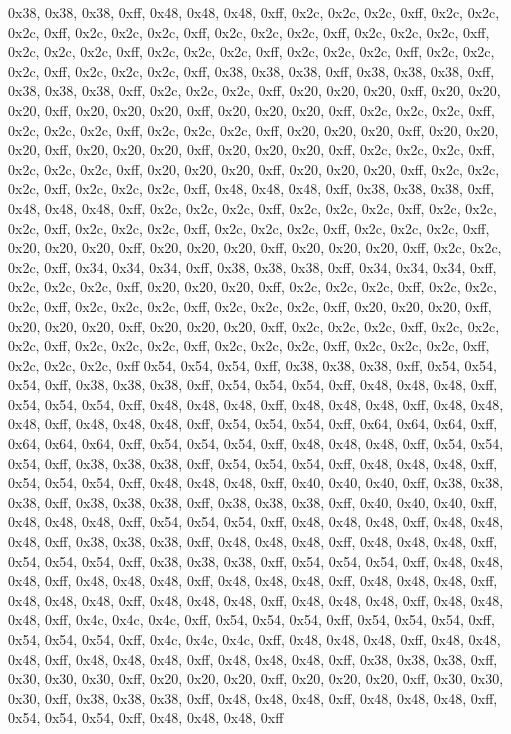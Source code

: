 0x38, 0x38, 0x38, 0xff, 0x48, 0x48, 0x48, 0xff, 0x2c, 0x2c, 0x2c, 0xff, 0x2c, 0x2c, 0x2c, 0xff, 0x2c, 0x2c, 0x2c, 0xff, 0x2c, 0x2c, 0x2c, 0xff, 0x2c, 0x2c, 0x2c, 0xff, 0x2c, 0x2c, 0x2c, 0xff, 0x2c, 0x2c, 0x2c, 0xff, 0x2c, 0x2c, 0x2c, 0xff, 0x2c, 0x2c, 0x2c, 0xff, 0x2c, 0x2c, 0x2c, 0xff, 0x38, 0x38, 0x38, 0xff, 0x38, 0x38, 0x38, 0xff, 0x38, 0x38, 0x38, 0xff, 0x2c, 0x2c, 0x2c, 0xff, 0x20, 0x20, 0x20, 0xff, 0x20, 0x20, 0x20, 0xff, 0x20, 0x20, 0x20, 0xff, 0x20, 0x20, 0x20, 0xff, 0x2c, 0x2c, 0x2c, 0xff, 0x2c, 0x2c, 0x2c, 0xff, 0x2c, 0x2c, 0x2c, 0xff, 0x20, 0x20, 0x20, 0xff, 0x20, 0x20, 0x20, 0xff, 0x20, 0x20, 0x20, 0xff, 0x20, 0x20, 0x20, 0xff, 0x2c, 0x2c, 0x2c, 0xff, 0x2c, 0x2c, 0x2c, 0xff, 0x20, 0x20, 0x20, 0xff, 0x20, 0x20, 0x20, 0xff, 0x2c, 0x2c, 0x2c, 0xff, 0x2c, 0x2c, 0x2c, 0xff, 0x48, 0x48, 0x48, 0xff, 0x38, 0x38, 0x38, 0xff, 0x48, 0x48, 0x48, 0xff, 0x2c, 0x2c, 0x2c, 0xff, 0x2c, 0x2c, 0x2c, 0xff, 0x2c, 0x2c, 0x2c, 0xff, 0x2c, 0x2c, 0x2c, 0xff, 0x2c, 0x2c, 0x2c, 0xff, 0x2c, 0x2c, 0x2c, 0xff, 0x20, 0x20, 0x20, 0xff, 0x20, 0x20, 0x20, 0xff, 0x20, 0x20, 0x20, 0xff, 0x2c, 0x2c, 0x2c, 0xff, 0x34, 0x34, 0x34, 0xff, 0x38, 0x38, 0x38, 0xff, 0x34, 0x34, 0x34, 0xff, 0x2c, 0x2c, 0x2c, 0xff, 0x20, 0x20, 0x20, 0xff, 0x2c, 0x2c, 0x2c, 0xff, 0x2c, 0x2c, 0x2c, 0xff, 0x2c, 0x2c, 0x2c, 0xff, 0x2c, 0x2c, 0x2c, 0xff, 0x20, 0x20, 0x20, 0xff, 0x20, 0x20, 0x20, 0xff, 0x20, 0x20, 0x20, 0xff, 0x2c, 0x2c, 0x2c, 0xff, 0x2c, 0x2c, 0x2c, 0xff, 0x2c, 0x2c, 0x2c, 0xff, 0x2c, 0x2c, 0x2c, 0xff, 0x2c, 0x2c, 0x2c, 0xff, 0x2c, 0x2c, 0x2c, 0xff
0x54, 0x54, 0x54, 0xff, 0x38, 0x38, 0x38, 0xff, 0x54, 0x54, 0x54, 0xff, 0x38, 0x38, 0x38, 0xff, 0x54, 0x54, 0x54, 0xff, 0x48, 0x48, 0x48, 0xff, 0x54, 0x54, 0x54, 0xff, 0x48, 0x48, 0x48, 0xff, 0x48, 0x48, 0x48, 0xff, 0x48, 0x48, 0x48, 0xff, 0x48, 0x48, 0x48, 0xff, 0x54, 0x54, 0x54, 0xff, 0x64, 0x64, 0x64, 0xff, 0x64, 0x64, 0x64, 0xff, 0x54, 0x54, 0x54, 0xff, 0x48, 0x48, 0x48, 0xff, 0x54, 0x54, 0x54, 0xff, 0x38, 0x38, 0x38, 0xff, 0x54, 0x54, 0x54, 0xff, 0x48, 0x48, 0x48, 0xff, 0x54, 0x54, 0x54, 0xff, 0x48, 0x48, 0x48, 0xff, 0x40, 0x40, 0x40, 0xff, 0x38, 0x38, 0x38, 0xff, 0x38, 0x38, 0x38, 0xff, 0x38, 0x38, 0x38, 0xff, 0x40, 0x40, 0x40, 0xff, 0x48, 0x48, 0x48, 0xff, 0x54, 0x54, 0x54, 0xff, 0x48, 0x48, 0x48, 0xff, 0x48, 0x48, 0x48, 0xff, 0x38, 0x38, 0x38, 0xff, 0x48, 0x48, 0x48, 0xff, 0x48, 0x48, 0x48, 0xff, 0x54, 0x54, 0x54, 0xff, 0x38, 0x38, 0x38, 0xff, 0x54, 0x54, 0x54, 0xff, 0x48, 0x48, 0x48, 0xff, 0x48, 0x48, 0x48, 0xff, 0x48, 0x48, 0x48, 0xff, 0x48, 0x48, 0x48, 0xff, 0x48, 0x48, 0x48, 0xff, 0x48, 0x48, 0x48, 0xff, 0x48, 0x48, 0x48, 0xff, 0x48, 0x48, 0x48, 0xff, 0x4c, 0x4c, 0x4c, 0xff, 0x54, 0x54, 0x54, 0xff, 0x54, 0x54, 0x54, 0xff, 0x54, 0x54, 0x54, 0xff, 0x4c, 0x4c, 0x4c, 0xff, 0x48, 0x48, 0x48, 0xff, 0x48, 0x48, 0x48, 0xff, 0x48, 0x48, 0x48, 0xff, 0x48, 0x48, 0x48, 0xff, 0x38, 0x38, 0x38, 0xff, 0x30, 0x30, 0x30, 0xff, 0x20, 0x20, 0x20, 0xff, 0x20, 0x20, 0x20, 0xff, 0x30, 0x30, 0x30, 0xff, 0x38, 0x38, 0x38, 0xff, 0x48, 0x48, 0x48, 0xff, 0x48, 0x48, 0x48, 0xff, 0x54, 0x54, 0x54, 0xff, 0x48, 0x48, 0x48, 0xff
